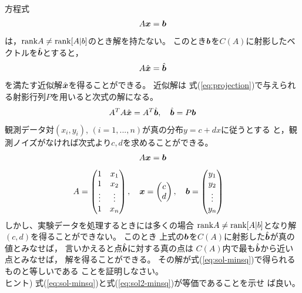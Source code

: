 \documentclass[twocolumn,11pt]{jarticle}
\begin{document}
方程式
\begin{align}
  A\boldsymbol{x}=\boldsymbol{b}\notag
\end{align}
は，$\mbox{rank} A\ne\mbox{rank}[A|b]$のとき解を持たない。
このとき$\boldsymbol{b}$を$C(A)$に射影したベクトルを$\hat{\boldsymbol{b}}$とすると，
\begin{align}
  A\hat{\boldsymbol{x}}=\hat{\boldsymbol{b}}\notag
\end{align}
を満たす近似解$\hat{\boldsymbol{x}}$を得ることができる。
近似解は
式(\ref{eq:projection})で与えられる射影行列$P$を用いると次式の解になる。
\begin{align}
  \label{eq:sol2-minsq}
  A^TA\hat{\boldsymbol{x}}=A^T\hat{\boldsymbol{b}},\quad \hat{\boldsymbol{b}}=P\boldsymbol{b}
\end{align}
\question
観測データ対$(x_i,y_i)$, $(i=1,...,n)$が真の分布$y=c+dx$に従うとする
と，観測ノイズがなければ次式より$c,d$を求めることができる。
\begin{align}
  A\boldsymbol{x}=\boldsymbol{b}\notag
\end{align}
\begin{align}
  A&=\begin{pmatrix}
    1 & x_1\\
    1 & x_2\\
    \vdots & \vdots \\
    1 & x_n
  \end{pmatrix},\quad
  \boldsymbol{x}=
  \begin{pmatrix}
    c \\ d
  \end{pmatrix},\quad
  \boldsymbol{b}=
  \begin{pmatrix}
    y_1 \\ y_2 \\\vdots \\ y_n
  \end{pmatrix}\notag
\end{align}
しかし、実験データを処理するときには多くの場合
$\mbox{rank} A\ne\mbox{rank}[A|b]$となり解$(c,d)$を得ることができない。
このとき
上式の$\boldsymbol{b}$を$C(A)$に射影した$\hat{\boldsymbol{b}}$が真の値とみなせば，
言いかえると点$\hat{\boldsymbol{b}}$に対する真の点は
$C(A)$内で最も$\hat{\boldsymbol{b}}$から近い点とみなせば，
解を得ることができる。
その解が式(\ref{eq:sol-minsq})で得られるものと等しいである
ことを証明しなさい。\\
ヒント) 式(\ref{eq:sol-minsq})と式(\ref{eq:sol2-minsq})が等価であることを示せ
ば良い。

\end{document}
